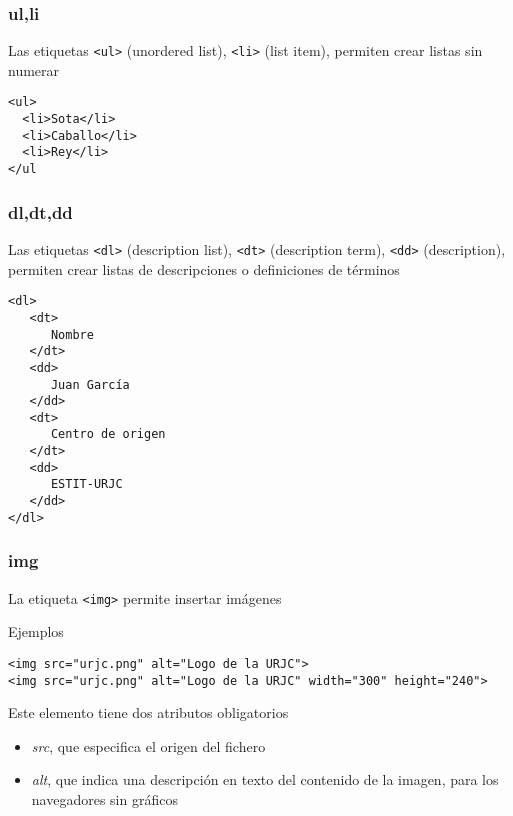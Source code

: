 \documentclass[ucs]{beamer}
\begin{document}
\begin{frame}[fragile]
\frametitle{ul,li}
Las etiquetas 
\verb|<ul>| (unordered list),
\verb|<li>| (list item),
permiten crear listas sin numerar

  \begin{footnotesize}
  \begin{verbatim}
<ul>
  <li>Sota</li>
  <li>Caballo</li>
  <li>Rey</li>
</ul
  \end{verbatim}
  \end{footnotesize}

\end{frame}

\begin{frame}[fragile]
\frametitle{dl,dt,dd}
Las etiquetas 
\verb|<dl>| (description list),
\verb|<dt>| (description term),
\verb|<dd>| (description),
permiten crear listas de descripciones o definiciones de términos

  \begin{footnotesize}
  \begin{verbatim}
<dl>
   <dt>
      Nombre
   </dt>
   <dd>
      Juan García
   </dd>
   <dt>
      Centro de origen
   </dt>
   <dd>
      ESTIT-URJC
   </dd>
</dl>
  \end{verbatim}
  \end{footnotesize}

\end{frame}

\begin{frame}[fragile]
\frametitle{img}
La etiqueta 
\verb|<img>| 
permite insertar imágenes

Ejemplos
  \begin{footnotesize}
  \begin{verbatim}
<img src="urjc.png" alt="Logo de la URJC">
<img src="urjc.png" alt="Logo de la URJC" width="300" height="240">
  \end{verbatim}
  \end{footnotesize}

Este elemento tiene dos atributos obligatorios
\begin{itemize}
\item
\emph{src}, que
especifica el origen del fichero
\item
\emph{alt}, que
indica una descripción en texto del contenido de la imagen, para
los navegadores sin gráficos
\end{itemize}

\end{frame}
\end{document}
